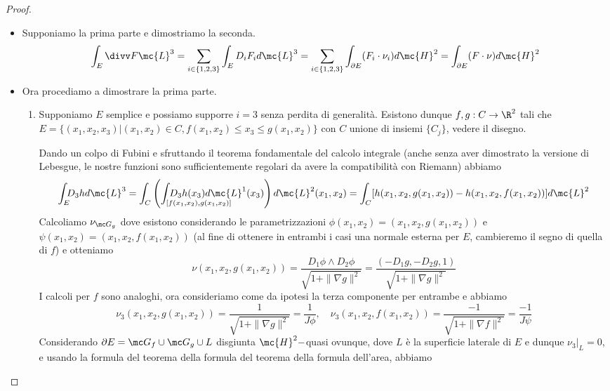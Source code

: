 \begin{proof}\begin{itemize}
    \item Supponiamo la prima parte e dimostriamo la seconda. \[\int_E \divv F \mc{L}^3 = \sum_{i \in \{1,2,3\}} \int_E D_i F_i d\mc{L}^3 = \sum_{i \in \{1,2,3\}} \int_{\partial E} (F_i \cdot \nu_i) d\mc{H}^2 = \int_{\partial E} (F \cdot \nu) d\mc{H}^2\]
    \item Ora procediamo a dimostrare la prima parte. \begin{enumerate}
        \item Supponiamo $E$ semplice e possiamo supporre $i=3$ senza perdita di generalità. Esistono dunque $f,g : C \to \R^2$ tali che $E = \{(x_1,x_2,x_3) | (x_1,x_2) \in C, f(x_1,x_2) \le x_3 \le g(x_1,x_2) \}$ con $C$ unione di insiemi $\{C_j\}$, vedere il disegno. 
        \begin{center}
        \end{center}
        Dando un colpo di Fubini e sfruttando il teorema fondamentale del calcolo integrale (anche senza aver dimostrato la versione di Lebesgue, le nostre funzioni sono sufficientemente regolari da avere la compatibilità con Riemann) abbiamo 
        \[\int_E \!\!\!D_3 h d\mc{L}^3 = \int_{C}\left(\int_{[f(x_1,x_2),g(x_1,x_2)]}\hspace{-2.3cm} D_3h(x_3) d\mc{L}^1(x_3)\right)d\mc{L}^2(x_1,x_2) = \int_C [h(x_1,x_2,g(x_1,x_2))-h(x_1,x_2,f(x_1,x_2))]d\mc{L}^2\]
        Calcoliamo $\nu_{\mc G_g}$ dove esistono considerando le parametrizzazioni $\phi(x_1,x_2) = (x_1,x_2,g(x_1,x_2))$ e $\psi(x_1,x_2) = (x_1,x_2,f(x_1,x_2))$ (al fine di ottenere in entrambi i casi una normale esterna per $E$, cambieremo il segno di quella di $f$) e otteniamo \[\nu(x_1,x_2,g(x_1,x_2)) = \frac{D_1\phi \wedge D_2\phi}{\sqrt{1+\|\nabla g\|^2}} = \frac{(-D_1g,-D_2g,1)}{\sqrt{1+\|\nabla g\|^2}}\] I calcoli per $f$ sono analoghi, ora consideriamo come da ipotesi la terza componente per entrambe e abbiamo \[\nu_3(x_1,x_2,g(x_1,x_2)) = \frac{1}{\sqrt{1 + \|\nabla g\|^2}} = \frac{1}{J\phi},\quad \nu_3(x_1,x_2,f(x_1,x_2)) = \frac{-1}{\sqrt{1 + \|\nabla f\|^2}} = \frac{-1}{J\psi} \] Considerando $\partial E = \mc G_f \cup \mc G_g \cup L$ disgiunta $\mc{H}^2-$quasi ovunque, dove $L$ è la superficie laterale di $E$ e dunque $\nu_3|_L = 0$, e usando la formula del teorema della formula del teorema della formula dell'area, abbiamo 

\end{enumerate}
\end{itemize}
\end{proof}
